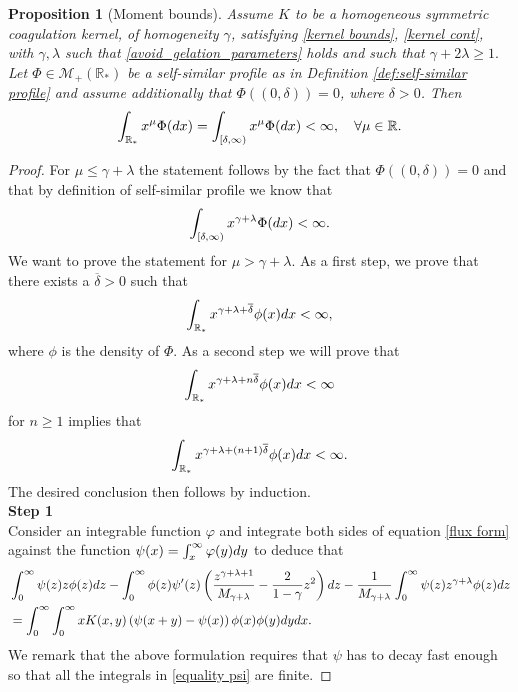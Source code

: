 \documentclass[11pt]{article}
\numberwithin{equation}{section}
\theoremstyle{plain}
\newtheorem{proposition}[theorem]{Proposition}
\newcommand{\der}{\textup{d}}
\begin{document}
\begin{proposition}[Moment bounds] \label{prop:moment bounds} 
Assume $K$ to be a homogeneous symmetric coagulation kernel, of homogeneity $\gamma$, satisfying
\eqref{kernel bounds},  \eqref{kernel cont},  with $\gamma , \lambda $ such that  \eqref{avoid_gelation_parameters} holds and such that
$
\gamma+2\lambda \geq  1.$
	Let $\Phi \in \mathcal M_+(\mathbb R_*)$ be a self-similar profile as in Definition \ref{def:self-similar profile} and assume additionally that $\Phi((0,\delta))=0$, where $\delta>0$.
	Then 
	\[
	\int_{\mathbb R_*} x^\mu \Phi(\der x) = \int_{[\delta, \infty )} x^\mu \Phi( \der x) < \infty, \quad \forall \mu \in \mathbb R. 
	\]
\end{proposition}
\begin{proof}
	For $\mu \leq \gamma + \lambda$ the statement follows by the fact that $\Phi((0, \delta))=0$ and that by definition of self-similar profile we know that
	\[
	\int_{[\delta, \infty )} x^{\gamma + \lambda} \Phi(\der x) < \infty.
	\]
	We want to prove the statement for $\mu > \gamma + \lambda.$
	As a first step, we prove that there exists a $\overline \delta >0$ such that 
	\begin{equation}\label{moment 1+delta}
	\int_{\mathbb R_*} x^{\gamma+ \lambda +\overline \delta } \phi(x) \der x  < \infty, 
	\end{equation}
	where $\phi$ is the density of $\Phi$.
	As a second step we will prove that 
	\begin{equation}\label{moment 1+(n-1)delta}
	\int_{\mathbb R_*} x^{\gamma+ \lambda +n \overline \delta } \phi(x) \der x  < \infty 
	\end{equation}
	for $n \geq 1$ implies that
	\begin{equation}\label{moment 1+ndelta}
	\int_{\mathbb R_*} x^{\gamma+ \lambda +(n+1)\overline \delta } \phi(x) \der x  < \infty. 
	\end{equation}
	The desired conclusion then follows by induction. \\

	\textbf{Step 1} \\
	Consider an integrable function $\varphi$ and integrate both sides of equation \eqref{flux form} against the function $\psi(x)= \int_x^\infty \varphi(y) \der y$ to deduce that 
	\begin{align} \label{equality psi}
&	\int_0^\infty \psi(z) z \phi(z) \der z  -  \int_0^\infty \phi(z) \psi'(z) \left( \frac{z^{\gamma+\lambda+1}}{M_{\gamma + \lambda}} - \frac{2}{1-\gamma } z^2 \right) \der z - \frac{1}{M_{\gamma+\lambda} } \int_0^\infty \psi(z) z^{\gamma+\lambda} \phi(z) \der z \nonumber\\
	&= \int_0^\infty \int_0^\infty x K(x,y) \left( \psi(x+y)-\psi(x)\right) \phi(x) \phi(y) \der y \der x .
	\end{align} 
We remark that the above formulation requires that $\psi$ has to decay fast enough so that all the integrals in \eqref{equality psi} are finite. 


\end{proof}
\end{document}
